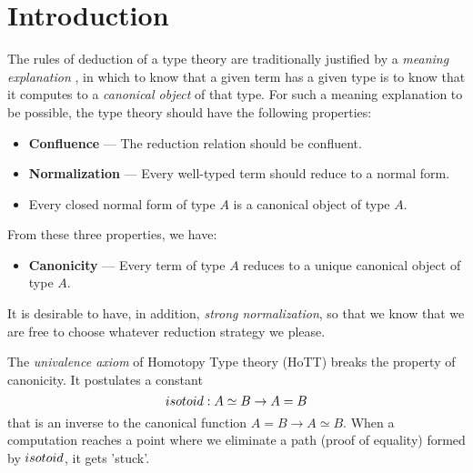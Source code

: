 \usepackage{amsmath}
\usepackage{amssymb}
\usepackage{autofe}
\usepackage{bbm}
\usepackage[greek,english]{babel}
\usepackage{etex}
\usepackage{framed}
\usepackage[utf8x]{inputenc}
\usepackage{proof}
\usepackage{stmaryrd}
\usepackage{suffix}
\usepackage{textalpha}
\usepackage{todo}
\usepackage{ucs}



\newcommand{\AgdaHide}[1]{}



\maketitle

\section{Introduction}

The rules of deduction of a type theory are traditionally justified by a \emph{meaning explanation} \cite{ML:ITT}, in which to know that a given term has a given type is to know that it computes to a \emph{canonical object} of that type.  For such a meaning explanation to be possible, the type theory should have the following properties:
\begin{itemize}
\item \textbf{Confluence} --- The reduction relation should be confluent.
\item \textbf{Normalization} --- Every well-typed term should reduce to a normal form.
\item Every closed normal form of type $A$ is a canonical object of type $A$.
\end{itemize}
From these three properties, we have:
\begin{itemize}
\item \textbf{Canonicity} --- Every term of type $A$ reduces to a unique canonical object of type $A$.
\end{itemize}

It is desirable to have, in addition, \emph{strong normalization}, so that we know that we are free to choose whatever reduction strategy we please.

The \emph{univalence axiom} of Homotopy Type theory (HoTT)  breaks the property of canonicity.  It postulates a
constant
\[ isotoid : A \simeq B \rightarrow A = B \]
that is an inverse to the canonical function $A = B \rightarrow A \simeq B$.  When a computation reaches a point
where we eliminate a path (proof of equality) formed by $isotoid$, it gets 'stuck'.


